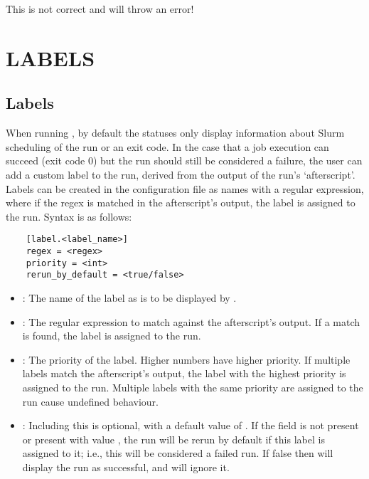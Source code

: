 \documentclass[a4paper,english]{article}
\begin{document}
\begin{adjustwidth}{18pt}{0pt}
        This is not correct and  will throw an error!

  \section{LABELS}
  \subsection{Labels}
  When running  , by default the statuses only display information
  about Slurm scheduling of the run or an exit code.
  In the case that a job execution can succeed (exit code 0) but the run should still
  be considered a failure, the user can add a custom label to the run, derived from
  the output of the run's `afterscript'.
  Labels can be created in the configuration file as names with a regular expression,
  where if the regex is matched in the afterscript's output, the label is assigned to the run.
  Syntax is as follows:

  \begin{verbatim}
    [label.<label_name>]
    regex = <regex>
    priority = <int>
    rerun_by_default = <true/false>
  \end{verbatim}

  \begin{itemize}
      \item {}: The name of the label as is to be displayed by  .
      \item {}: The regular expression to match against the afterscript's output.
      If a match is found, the label is assigned to the run.
      \item {}: The priority of the label.
      Higher numbers have higher priority.
      If multiple labels match the afterscript's output, the label with the highest priority is assigned to the run.
      Multiple labels with the same priority are assigned to the run cause undefined behaviour.
      \item {}: Including this is optional, with a default value of .
      If the field is not present or present with value , the run will be rerun by default if
      this label is assigned to it; i.e., this will be considered a failed run.
      If false then   will display the run as successful, and   will ignore it.
  \end{itemize}


\end{adjustwidth}
\end{document}
